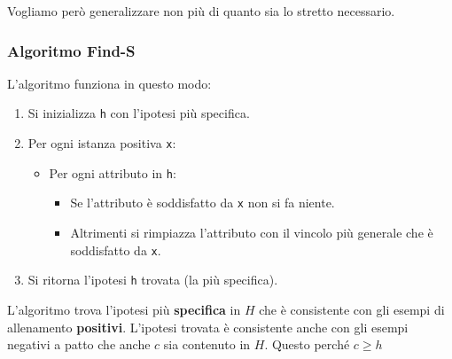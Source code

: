 Vogliamo per\`o generalizzare non pi\`u di quanto sia lo stretto necessario.

\subsubsection{Algoritmo Find-S}
L'algoritmo funziona in questo modo:
\begin{enumerate}
	\item Si inizializza \verb|h| con l'ipotesi pi\`u specifica.
	\item Per ogni istanza positiva \verb|x|:
	      \begin{itemize}
		      \item Per ogni attributo in \verb|h|:
		            \begin{itemize}
			            \item Se l'attributo \`e soddisfatto da \verb|x| non si fa niente.
			            \item Altrimenti si rimpiazza l'attributo con il vincolo pi\`u generale che \`e soddisfatto da
			                  \verb|x|.
		            \end{itemize}
	      \end{itemize}
	\item Si ritorna l'ipotesi \verb|h| trovata (la pi\`u specifica).
\end{enumerate}

L'algoritmo trova l'ipotesi pi\`u \textbf{specifica} in $H$ che \`e consistente con gli esempi di allenamento
\textbf{positivi}. L'ipotesi trovata \`e consistente anche con gli esempi negativi a patto che anche $c$ sia
contenuto in $H$. Questo perch\'e $c \geq h$

